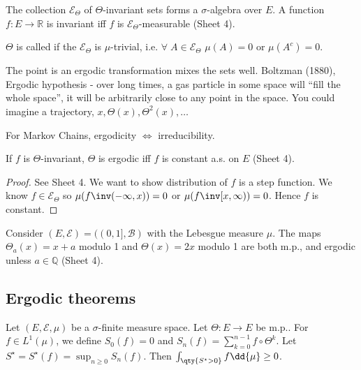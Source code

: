 The collection $\mathcal E_\Theta$ of $\Theta$-invariant sets forms a $\sigma$-algebra over $E$.
A function $f \colon E \to \mathbb R$ is invariant iff $f$ is $\mathcal E_\Theta$-measurable (Sheet 4).

\begin{definition}[Ergodic]
	$\Theta$ is called  if the $\mathcal{E}_\Theta$ is $\mu$-trivial, i.e. $\forall \; A \in \mathcal{E}_\Theta$ $\mu(A) = 0$ or $\mu(A^c) = 0$.
\end{definition}

The point is an ergodic transformation mixes the sets well.
Boltzman (1880), Ergodic hypothesis - over long times, a gas particle in some space will ``fill the whole space'', it will be arbitrarily close to any point in the space.
You could imagine a trajectory, $x, \Theta(x), \Theta^2(x), \dots$


For Markov Chains, ergodicity $\iff$ irreducibility.

\begin{fact}
	If $f$ is $\Theta$-invariant, $\Theta$ is ergodic iff $f$ is constant a.s. on $E$ (Sheet 4).
\end{fact}

\begin{proof}
	See Sheet 4.
	We want to show distribution of $f$ is a step function.
	We know $f \in \mathcal{E}_\Theta$ so $\mu(f\inv(-\infty, x)) = 0$ or $\mu(f\inv[x, \infty)) = 0$.
	Hence $f$ is constant. %
\end{proof}

\begin{example}
	Consider $(E, \mathcal E) = ((0,1], \mathcal B)$ with the Lebesgue measure $\mu$.
	The maps $\Theta_a(x) = x + a$ modulo 1 and $\Theta(x) = 2x$ modulo 1 are both m.p., and ergodic unless $a \in \mathbb Q$ (Sheet 4).
\end{example}

\subsection{Ergodic theorems}
\begin{lemma} \label{lem:max}
    Let $(E, \mathcal E, \mu)$ be a $\sigma$-finite measure space.
	Let $\Theta \colon E \to E$ be m.p..
	For $f \in L^1(\mu)$, we define $S_0(f) = 0$ and $S_n(f) = \sum_{k=0}^{n-1} f \circ \Theta^k$.
    Let $S^\star = S^\star(f) = \sup_{n \geq 0} S_n(f)$.
    Then $\int_{\qty{S^\star > 0}} f \dd{\mu} \geq 0$.
\end{lemma}

